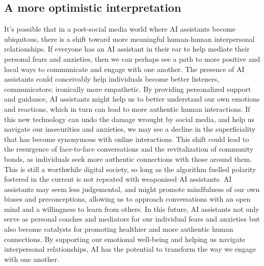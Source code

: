 \subsection{A more optimistic interpretation}
It's possible that in a post-social media world where AI assistants become ubiquitous, there is a shift toward more meaningful human-human interpersonal relationships. If everyone has an AI assistant in their ear to help mediate their personal fears and anxieties, then we can perhaps see a path to more positive and local ways to communicate and engage with one another. The presence of AI assistants could conceivably help individuals become better listeners, communicators; ironically more empathetic. By providing personalized support and guidance, AI assistants might help us to better understand our own emotions and reactions, which in turn can lead to more authentic human interactions. If this new technology can undo the damage wrought by social media, and help us navigate our insecurities and anxieties, we may see a decline in the superficiality that has become synonymous with online interactions. This shift could lead to the resurgence of face-to-face conversations and the revitalization of community bonds, as individuals seek more authentic connections with those around them. This is still a worthwhile digital society, so long as the algorithm fuelled polarity fostered in the current is not repeated with weaponised AI assistants. AI assistants may seem less judgemental, and might promote mindfulness of our own biases and preconceptions, allowing us to approach conversations with an open mind and a willingness to learn from others. In this future, AI assistants not only serve as personal coaches and mediators for our individual fears and anxieties but also become catalysts for promoting healthier and more authentic human connections. By supporting our emotional well-being and helping us navigate interpersonal relationships, AI has the potential to transform the way we engage with one another. 
\newpage

